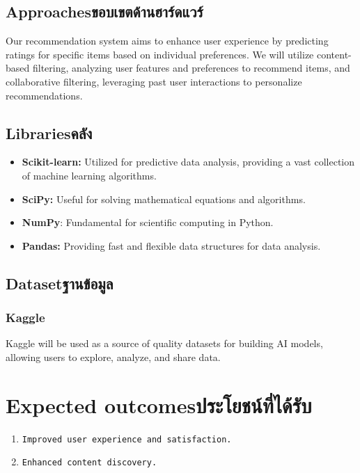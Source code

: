 \subsection{\ifenglish Approaches\else ขอบเขตด้านฮาร์ดแวร์\fi}

Our recommendation system aims to enhance user experience by predicting ratings for specific 
items based on individual preferences. We will utilize content-based filtering, analyzing user 
features and preferences to recommend items, and collaborative filtering, leveraging past user 
interactions to personalize recommendations.

\subsection{\ifenglish Libraries\else คลัง\fi}

\begin{itemize}
    \item \textsf{\textbf{Scikit-learn:} Utilized for predictive data analysis, providing a vast 
    collection of machine learning algorithms.}
    \item \textsf{\textbf{SciPy:} Useful for solving mathematical equations and algorithms.}
    \item \textsf{\textbf{NumPy}: Fundamental for scientific computing in Python.}
    \item \textsf{\textbf{Pandas:} Providing fast and flexible data structures for data analysis.}
\end{itemize}

\subsection{\ifenglish Dataset\else ฐานข้อมูล\fi}

\subsubsection{Kaggle}

Kaggle will be used as a source of quality datasets for building AI models, allowing 
users to explore, analyze, and share data.

\section{\ifenglish Expected outcomes\else ประโยชน์ที่ได้รับ\fi}
\begin{enumerate}
    \item \texttt{Improved user experience and satisfaction.}
    \item \texttt{Enhanced content discovery.}
\end{enumerate}

